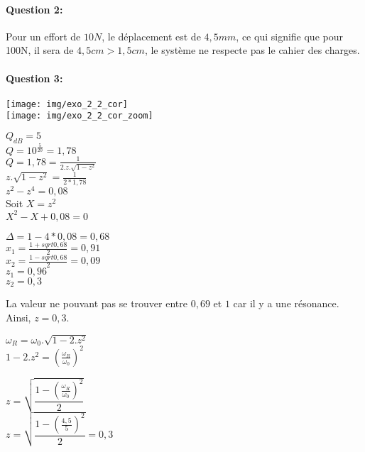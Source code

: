 \paragraph{Question 2:}

Pour un effort de $10N$, le déplacement est de $4,5mm$, ce qui signifie que pour 100N, il sera de $4,5cm>1,5cm$, le système ne respecte pas le cahier des charges.

\paragraph{Question 3:}

\begin{center}
 \texttt{[image: img/exo\_2\_2\_cor]}\\
 \texttt{[image: img/exo\_2\_2\_cor\_zoom]}
\end{center}

\begin{minipage}{0.45\linewidth}
$Q_{dB}=5$ \\
$Q=10^{\frac{5}{20}}=1,78$\\
$Q=1,78=\frac{1}{2.z.\sqrt{1-z^2}}$ \\
$z.\sqrt{1-z^2}=\frac{1}{2*1,78}$ \\
$z^2-z^4=0,08$ \\
Soit $X=z^2$ \\
$X^2-X+0,08=0$
\end{minipage}\hfill
\begin{minipage}{0.45\linewidth}
$\Delta=1-4*0,08=0,68$ \\
$x_1=\frac{1+sqrt{0,68}}{2}=0,91$ \\
$x_2=\frac{1-sqrt{0,68}}{2}=0,09$ \\
$z_1=0,96$ \\
$z_2=0,3$
\end{minipage}

La valeur ne pouvant pas se trouver entre $0,69$ et $1$ car il y a une résonance. Ainsi, $z=0,3$.

\begin{minipage}{0.45\linewidth}
$\omega_R=\omega_0.\sqrt{1-2.z^2}$ \\
$1-2.z^2=\left(\frac{\omega_R}{\omega_0}\right)^2$
\end{minipage}\hfill
\begin{minipage}{0.45\linewidth}
$z=\sqrt{\dfrac{1-\left(\frac{\omega_R}{\omega_0}\right)^2}{2}}$\\
$z=\sqrt{\dfrac{1-\left(\frac{4,5}{5}\right)^2}{2}}=0,3$
\end{minipage}

